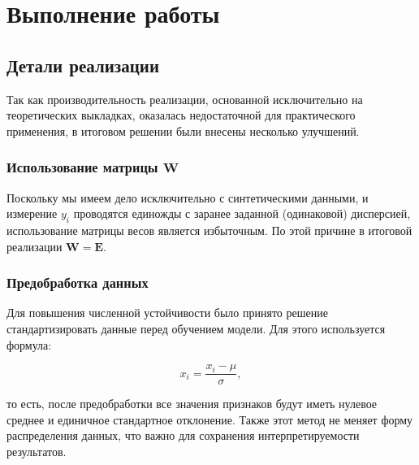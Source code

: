 


\newcommand{\subject}{Дифференциальные уравнения}
\newcommand{\theme}{Аппроксимация данных линейной комбинацией экспоненциальных функций}
\newcommand{\teacher}{Колоницкий С.Б.}
\newcommand{\studentn}{Поглазов Н.В.}
\newcommand{\studentr}{Цыганков Р.М.}
\newcommand{\groupnumber}{2384}
\newcommand{\group}{Группа 2384}





\setcounter{page}{2}



\section{Выполнение работы}
\subsection{Детали реализации}

Так как производительность реализации, основанной исключительно на теоретических выкладках, оказалась недостаточной для практического применения, в итоговом решении были внесены несколько улучшений.

\subsubsection{Использование матрицы $\mathbf{W}$}

Поскольку мы имеем дело исключительно с синтетическими данными, и измерение $y_i$ проводятся единожды с заранее заданной (одинаковой) дисперсией, использование матрицы весов является избыточным. По этой причине в итоговой реализации $\mathbf{W} = \mathbf{E}$.

\subsubsection{Предобработка данных}

Для повышения численной устойчивости было принято решение стандартизировать данные перед обучением модели. Для этого используется формула:

\[
	x_i = \frac{x_i - \mu}{\sigma},
\]

то есть, после предобработки все значения признаков будут иметь нулевое среднее и единичное стандартное отклонение. Также этот метод не меняет форму распределения данных, что важно для сохранения интерпретируемости результатов.

